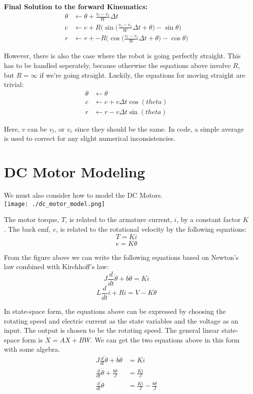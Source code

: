 \documentclass{article}
\begin{document}
\textbf{Final Solution to the forward Kinematics:}
\begin{align}
 \theta &\leftarrow \theta + \frac{v_l-v_r}{W}\Delta t \\
  c &\leftarrow c + R\Bigg(\sin{\Big(\frac{v_l-v_r}{W}\Delta t+\theta\Big)}-\sin{\theta}\Bigg) \\
  r &\leftarrow r + -R\Bigg(\cos{\Big(\frac{v_l-v_r}{W}\Delta t+\theta\Big)}-\cos{\theta}\Bigg)
\end{align}

However, there is also the case where the robot is going perfectly straight. This has to be handled seperately, because otherwise the equations above involve $R$, but $R=\infty$ if we're going straight. Luckily, the equations for moving straight are trivial:
\begin{align}
 \theta &\leftarrow \theta \\
  c &\leftarrow c + v\Delta t\cos(theta) \\
  r &\leftarrow r - v\Delta t\sin(theta)
\end{align}

Here, $v$ can be $v_l$, or $v_r$ since they should be the same. In code, a simple average is used to correct for any slight numerical inconsistencies. \\

\section{DC Motor Modeling}
We must also consider how to model the DC Motors. \\

\texttt{[image: ./dc\_motor\_model.png]}

The motor torque, $T$, is related to the armature current, $i$, by a constant factor $K$. The back emf, $e$, is related to the rotational velocity by the following equations:
$$T=Ki$$
$$e=K\dot{\theta}$$

From the figure above we can write the following equations based on Newton's law combined with Kirchhoff's law:
$$J\frac{d}{dt}\dot{\theta} + b\dot{\theta} = Ki$$
$$L\frac{d}{dt}i+Ri=V-K\dot{\theta}$$

In state-space form, the equations above can be expressed by choosing the rotating speed and electric current as the state variables and the voltage as an input. The output is chosen to be the rotating speed. The general linear state-space form is $\dot{X} = AX + BW$. We can get the two equations above in this form with some algebra.
\begin{align}
  J\frac{d}{dt}\dot{\theta} + b\dot{\theta} &= Ki \\
  \frac{d}{dt}\dot{\theta} + \frac{b\dot{\theta}}{J} &= \frac{Ki}{J} \\
  \frac{d}{dt}\dot{\theta} &= \frac{Ki}{J} - \frac{b\dot{\theta}}{J}
\end{align}
\end{document}
